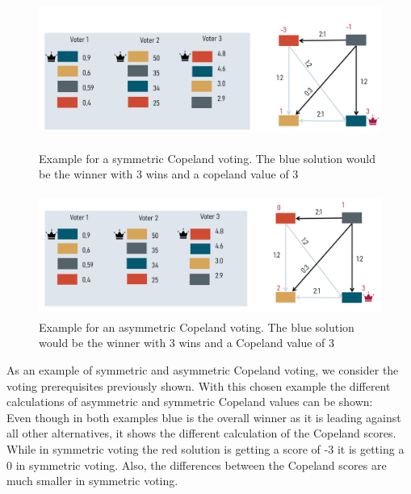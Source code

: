 \documentclass[german, a4paper, 11pt, oneside]{scrbook}
\begin{document}
\begin{figure}[h]
\centering
\includegraphics[height=4.4cm]{Copeland}
\caption{Example for a symmetric Copeland voting. The blue solution would be the winner with 3 wins and a copeland value of 3}
\includegraphics[height=4cm]{Copeland_asym}
\caption{Example for an asymmetric Copeland voting. The blue solution would be the winner with 3 wins and a Copeland value of 3}
\end{figure}
As an example of symmetric and asymmetric Copeland voting, we consider the voting prerequisites previously shown. With this chosen example the different calculations of asymmetric and symmetric Copeland values can be shown:
\\Even though in both examples blue is the overall winner as it is leading against all other alternatives, it shows the different calculation of the Copeland scores. While in symmetric voting the red solution is getting a score of -3 it is getting a 0 in symmetric voting. Also, the differences between the Copeland scores are much smaller in symmetric voting.
\end{document}
